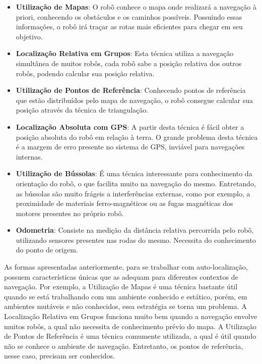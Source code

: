 	\begin{itemize}
		\item \textbf{Utilização de Mapas}: O robô conhece o mapa onde realizará a navegação à priori, conhecendo os obstáculos e os caminhos possíveis. Possuindo essas informações, o robô irá traçar as rotas mais eficientes para chegar em seu objetivo.

		\item \textbf{Localização Relativa em Grupos}: Esta técnica utiliza a navegação simultânea de muitos robôs, cada robô sabe a posição relativa dos outros robôs, podendo calcular sua posição relativa.

		\item \textbf{Utilização de Pontos de Referência}: Conhecendo pontos de referência que estão distribuídos pelo mapa de navegação, o robô consegue calcular sua posição através da técnica de triangulação.

		\item \textbf{Localização Absoluta com GPS}: A partir desta técnica é fácil obter a posição absoluta do robô em relação à terra. O grande problema desta técnica é a margem de erro presente no sistema de GPS, inviável para navegações internas.

		\item \textbf{Utilização de Bússolas}: É uma técnica interessante para conhecimento da orientação do robô, o que facilita muito na navegação do mesmo. Entretando, as bússolas são muito frágeis a interferências externas, como por exemplo, a proximidade de materiais ferro-magnéticos ou as fugas magnéticas dos motores presentes no próprio robô.

		\item \textbf{Odometria}: Consiste na medição da distância relativa percorrida pelo robô, utilizando sensores presentes nas rodas do mesmo. Necessita do conhecimento do ponto de origem.
		 
	\end{itemize}

	As formas apresentadas anteriormente, para se trabalhar com auto-localização, possuem características únicas que as adequam para diferentes contextos de navegação. Por exemplo, a Utilização de Mapas é uma técnica bastante útil quando se está trabalhando com um ambiente conhecido e estático, porém, em ambientes mutáveis e não conhecidos, essa estratégia se torna um problema. A Localização Relativa em Grupos funciona muito bem quando a navegação envolve muitos robôs, a qual não necessita de conhecimento prévio do mapa. A Utilização de Pontos de Referência é uma técnica comumente utilizada, a qual é útil quando não se conhece o ambiente de navegação. Entretanto, os pontos de referência, nesse caso, precisam ser conhecidos. 

